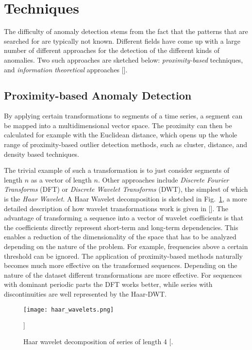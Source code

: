 \newpage
\section{Techniques}
\label{sec:techniques}

The difficulty of anomaly detection stems from the fact that the patterns that
are searched for are typically not known.  Different fields have come up with a
large number of different approaches for the detection of the different kinds
of anomalies. Two such approaches  are sketched below: \emph{proximity-based}
techniques, and {\em information theoretical} approaches [\cite{AggarwalCharuC2017}].

\subsection{Proximity-based Anomaly Detection}
\label{sub:proximity_based_anomaly_detection}

By applying certain transformations to segments of a time series, a segment can be
mapped into a multidimensional vector space. The proximity can then be
calculated for example with the Euclidean distance, which opens up the whole
range of proximity-based outlier detection methods, such as cluster, distance,
and density based techniques.

The trivial example of such a transformation is to just consider segments of
length $n$ as a vector of length $n$.  Other approaches include \emph{Discrete
Fourier Transforms} (DFT) or \emph{Discrete Wavelet Transforms} (DWT), the
simplest of which is the \emph{Haar Wavelet}. A Haar Wavelet decomposition is
sketched in Fig.~\ref{fig:haar_wavelets}, a more detailed description of how
wavelet transformations work is given in [\cite{AggarwalCharuC2017}]. The
advantage of transforming a sequence into a vector of wavelet coefficients is
that the coefficients directly represent short-term and long-term dependencies.
This enables a reduction of the dimensionality of the space that has to be
analyzed depending on the nature of the problem. For example, frequencies above
a certain threshold can be ignored.  The application of proximity-based methods
naturally becomes much more effective on the transformed sequences. Depending
on the nature of the dataset different transformations are more effective.  For
sequences with dominant periodic parts the DFT works better, while series with
discontinuities are well represented by the Haar-DWT.

\begin{figure}
  \centering
  \texttt{[image: haar\_wavelets.png]}
  \caption{Haar wavelet decomposition of series of length 4
  [\cite{AggarwalCharuC2017}.}]
  \label{fig:haar_wavelets}
\end{figure}


